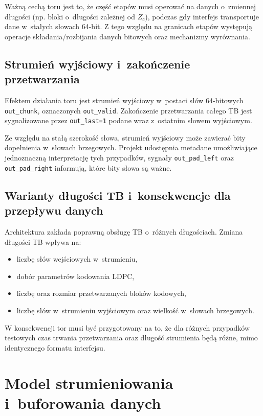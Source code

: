 Ważną cechą toru jest to, że część etapów musi operować na danych o~zmiennej długości (np. bloki o~długości zależnej od $Z_c$), podczas gdy interfejs transportuje dane w~stałych słowach 64-bit. Z tego względu na granicach etapów występują operacje składania/rozbijania danych bitowych oraz mechanizmy wyrównania.

\subsection{Strumień wyjściowy i~zakończenie przetwarzania}
Efektem działania toru jest strumień wyjściowy w~postaci słów 64-bitowych \texttt{out\_chunk}, oznaczonych \texttt{out\_valid}. Zakończenie przetwarzania całego TB jest sygnalizowane przez \texttt{out\_last=1} podane wraz z~ostatnim słowem wyjściowym.

Ze względu na stałą szerokość słowa, strumień wyjściowy może zawierać bity dopełnienia w~słowach brzegowych. Projekt udostępnia metadane umożliwiające jednoznaczną interpretację tych przypadków, sygnały \texttt{out\_pad\_left} oraz \texttt{out\_pad\_right} informują, które bity słowa są ważne.

\subsection{Warianty długości TB i~konsekwencje dla przepływu danych}
Architektura zakłada poprawną obsługę TB o~różnych długościach. Zmiana długości TB wpływa na:
\begin{itemize}
    \item liczbę słów wejściowych w~strumieniu,
    \item dobór parametrów kodowania LDPC,
    \item liczbę oraz rozmiar przetwarzanych bloków kodowych,
    \item liczbę słów w~strumieniu wyjściowym oraz wielkość  w~słowach brzegowych.
\end{itemize}

W konsekwencji tor musi być przygotowany na to, że dla różnych przypadków testowych czas trwania przetwarzania oraz długość strumienia będą różne, mimo identycznego formatu interfejsu.


\section{Model strumieniowania i~buforowania danych}
\label{sec:strumieniowanie_buforowanie}

